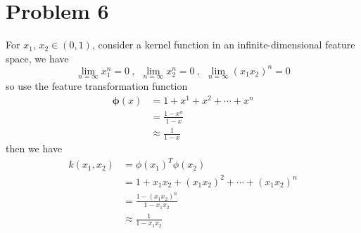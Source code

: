 \documentclass{article}
\begin{document}
\section*{Problem 6}
For $x_1$, $x_2 \in (0,1)$, consider a kernel function in an infinite-dimensional feature space, we have
\begin{equation}
	\lim\limits_{n = \infty} x_1^n = 0 \ ,\ \ \lim\limits_{n = \infty}x_2^n =0 \ ,\ \ \lim\limits_{n = \infty}(x_1x_2)^n=0
\end{equation}
so use the feature transformation function
\begin{equation}
	\begin{aligned}
		\bm{\phi}(x) 
		&= 1 + x^1 + x^2 + \cdots + x^n\\
		&= \frac{1-x^n}{1-x}\\
		& \approx \frac{1}{1-x}
	\end{aligned}	
\end{equation}
then we have 
\begin{equation}
	\begin{aligned}
		k(x_1, x_2)
		&= \phi(x_1)^T \phi(x_2)\\
		&= 1 + x_1x_2 +(x_1x_2)^2 + \cdots + (x_1x_2)^n\\
		&= \frac{1-(x_1x_2)^n}{1-x_1x_2}\\
		& \approx \frac{1}{1-x_1x_2}
	\end{aligned}
\end{equation}


\small


\end{document}
